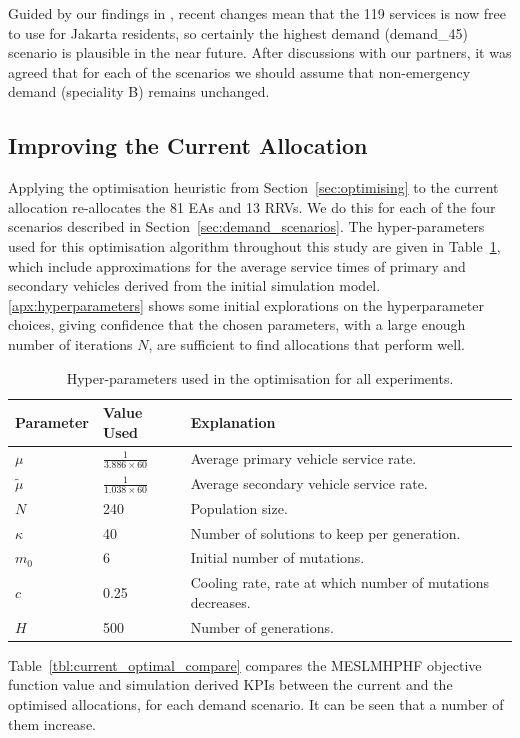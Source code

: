 \documentclass[preprint,12pt]{elsarticle}
\begin{document}
Guided by our findings in \cite{BriceSyaribahNoor2022Esui}, recent changes
mean that the 119 services is now free to use for Jakarta residents, so
certainly the highest demand (demand\_45) scenario is plausible in the near
future. After discussions with our partners, it was agreed that for each of
the scenarios we should assume that non-emergency demand (speciality B)
remains unchanged.


\subsection{Improving the Current Allocation}\label{sec:optimise_current}
Applying the optimisation heuristic from Section~\ref{sec:optimising} to the
current allocation re-allocates the 81 EAs and 13 RRVs. We do this for each of
the four scenarios described in Section~\ref{sec:demand_scenarios}. The
hyper-parameters used for this optimisation algorithm throughout this study are
given in Table~\ref{tbl:hyperparameters}, which include approximations for the
average service times of primary and secondary vehicles derived from the initial
simulation model. \ref{apx:hyperparameters} shows some initial explorations on
the hyperparameter choices, giving confidence that the chosen parameters, with
a large enough number of iterations $N$, are sufficient to find allocations
that perform well.

\begin{table}
\begin{tabular}{lll}
\toprule
Parameter & Value Used & Explanation \\
\midrule
$\mu$ & $\frac{1}{3.886 \times 60}$ & Average primary vehicle service rate.\\
$\tilde{\mu}$ & $\frac{1}{1.038 \times 60}$ & Average secondary vehicle service rate.\\
$N$ & 240 & Population size.\\
$\kappa$ & 40 & Number of solutions to keep per generation.\\
$m_0$ & 6 & Initial number of mutations.\\
$c$ & 0.25 & Cooling rate, rate at which number of mutations decreases.\\
$H$ & 500 & Number of generations.\\
\bottomrule
\end{tabular}
\caption{Hyper-parameters used in the optimisation for all experiments.}
\label{tbl:hyperparameters}
\end{table}

Table~\ref{tbl:current_optimal_compare} compares the MESLMHPHF objective
function value and simulation derived KPIs between the current and the optimised
allocations, for each demand scenario. It can be seen that a number of them
increase.
\end{document}
